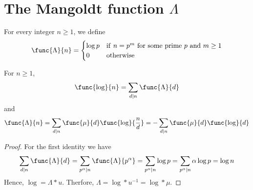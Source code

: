 \section{The Mangoldt function \(\Lambda\)}
\begin{definition}
    For every integer \(n \geq 1\), we define 
    \begin{equation*}
        \func{\Lambda}{n} = \begin{cases}
            \log p & \mathrm{if\ } n = p^m \mathrm{\ for\ some\ prime\ } p \mathrm{\ and\ } m \geq 1\\
            0 & \mathrm{otherwise}
        \end{cases}
    \end{equation*}
\end{definition}
\begin{theorem}
    For \(n \geq 1\),
    \begin{equation*}
        \func{\log}{n} = \sum_{d \mid n} \func{\Lambda}{d}
    \end{equation*}
    and 
    \begin{equation*}
        \func{\Lambda}{n} = \sum_{d \mid n} \func{\mu}{d} \func{\log}{\frac{n}{d}} = - \sum_{d \mid n} \func{\mu}{d} \func{\log}{d}
    \end{equation*}
\end{theorem}

\begin{proof}
    For the first identity we have 
    \begin{equation*}
        \sum_{d \mid n} \func{\Lambda}{d} = \sum_{p^{\alpha} \mid n} \func{\Lambda}{p^{\alpha}} = \sum_{p^{\alpha} \mid n} \log p = \sum_{p^{\alpha} \mid n} \alpha \log p = \log n
    \end{equation*}
    Hence, \(\log = \Lambda \ast u\). Therfore, \(\Lambda = \log \ast u^{-1} = \log \ast \mu\).
\end{proof}
